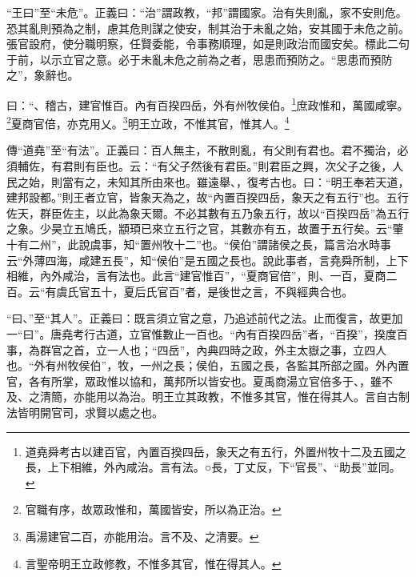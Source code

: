 {\noindent\shu{}\fzkt “王曰”至“未危”。正義曰：“治”謂政教，“邦”謂國家。治有失則亂，家不安則危。恐其亂則預為之制，慮其危則謀之使安，制其治于未亂之始，安其國于未危之前。張官設府，使分職明察，任賢委能，令事務順理，如是則政治而國安矣。標此二句于前，以示立官之意。必于未亂未危之前為之者，思患而預防之。“思患而預防之”，象辭也。 \par}

曰：“、稽古，建官惟百。內有百揆四岳，外有州牧侯伯。\footnote{道堯舜考古以建百官，內置百揆四岳，象天之有五行，外置州牧十二及五國之長，上下相維，外內咸治。言有法。○長，丁丈反，下“官長”、“助長”並同。}庶政惟和，萬國咸寧。\footnote{官職有序，故眾政惟和，萬國皆安，所以為正治。}夏商官倍，亦克用乂。\footnote{禹湯建官二百，亦能用治。言不及、之清要。}明王立政，不惟其官，惟其人。\footnote{言聖帝明王立政修教，不惟多其官，惟在得其人。}


{\noindent\zhuan{}\fzbyks 傳“道堯”至“有法”。正義曰：百人無主，不散則亂，有父則有君也。君不獨治，必須輔佐，有君則有臣也。云：“有父子然後有君臣。”則君臣之興，次父子之後，人民之始，則當有之，未知其所由來也。雖遠舉、，復考古也。曰：“明王奉若天道，建邦設都。”則王者立官，皆象天為之，故“內置百揆四岳，象天之有五行”也。五行佐天，群臣佐主，以此為象天爾。不必其數有五乃象五行，故以“百揆四岳”為五行之象。少昊立五鳩氏，顓頊已來立五行之官，其數亦有五，故置于五行矣。云“肇十有二州”，此說虞事，知“置州牧十二”也。“侯伯”謂諸侯之長，篇言治水時事云“外薄四海，咸建五長”，知“侯伯”是五國之長也。說此事者，言堯舜所制，上下相維，內外咸治，言有法也。此言“建官惟百”，“夏商官倍”，則、一百，夏商二百。云“有虞氏官五十，夏后氏官百”者，是後世之言，不與經典合也。 \par}

{\noindent\shu{}\fzkt “曰、”至“其人”。正義曰：既言須立官之意，乃追述前代之法。止而復言，故更加一“曰”。唐堯考行古道，立官惟數止一百也。“內有百揆四岳”者，“百揆”，揆度百事，為群官之首，立一人也；“四岳”，內典四時之政，外主太嶽之事，立四人也。“外有州牧侯伯”，牧，一州之長；侯伯，五國之長，各監其所部之國。外內置官，各有所掌，眾政惟以協和，萬邦所以皆安也。夏禹商湯立官倍多于、，雖不及、之清簡，亦能用以為治。明王立其政教，不惟多其官，惟在得其人。言自古制法皆明開官司，求賢以處之也。 \par}

